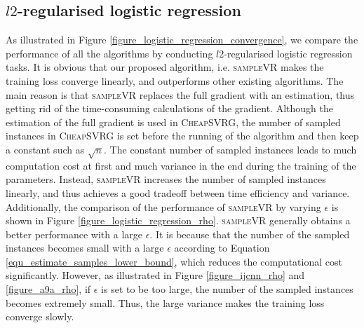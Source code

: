 \documentclass[letterpaper]{article}
\begin{document}
\subsection{$l2$-regularised logistic regression}
\label{sect_performance_evaluation_convergence}
As illustrated in Figure \ref{figure_logistic_regression_convergence}, we compare the performance of all the algorithms by conducting $l2$-regularised logistic regression tasks.  It is obvious that our proposed algorithm, i.e. \textsc{sampleVR} makes the training loss converge linearly, and outperforms other existing algorithms.   The main reason is that  \textsc{sampleVR} replaces   the full gradient with an estimation, thus getting rid of the time-consuming calculations of the gradient.  Although the estimation of the full gradient is used in  \textsc{CheapSVRG}, the number of sampled instances in \textsc{CheapSVRG}  is set before the running of the algorithm and then keep a constant such as $\sqrt{n}$. The constant number of sampled instances leads to much computation cost at first and much variance in the end during the training of the parameters.    Instead,  \textsc{sampleVR} increases the number of sampled instances linearly, and thus achieves a good tradeoff between time efficiency and variance. 
Additionally, the comparison of the  performance of \textsc{sampleVR} by varying   $\epsilon$ is shown  in Figure \ref{figure_logistic_regression_rho}. \textsc{sampleVR} generally obtains a better performance with a large $\epsilon$. It is because that the number of the sampled instances becomes small with a large $\epsilon$ according to Equation \ref{equ_estimate_samples_lower_bound}, which  reduces the computational cost significantly. However, as illustrated in Figure \ref{figure_ijcnn_rho} and \ref{figure_a9a_rho}, if $\epsilon$ is set to be too large, the number of the sampled instances becomes extremely small.  Thus, the large variance makes the training loss converge slowly. 
\end{document}
